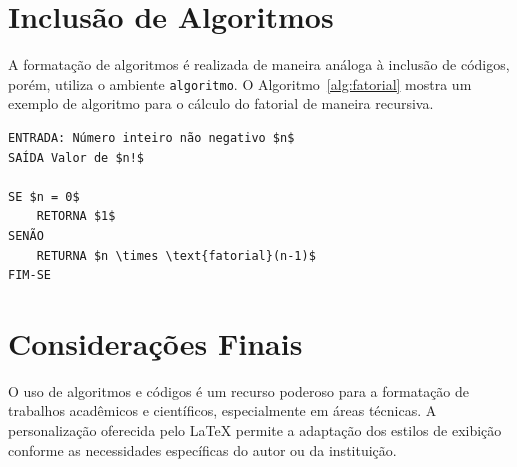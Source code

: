 \section{Inclusão de Algoritmos}

A formatação de algoritmos é realizada de maneira análoga à inclusão de códigos, porém, utiliza o ambiente \texttt{algoritmo}. O Algoritmo~\ref{alg:fatorial} mostra um exemplo de algoritmo para o cálculo do fatorial de maneira recursiva.

\begin{algoritmo}
\begin{lstlisting}[mathescape]
ENTRADA: Número inteiro não negativo $n$
SAÍDA Valor de $n!$

SE $n = 0$
    RETORNA $1$
SENÃO
    RETURNA $n \times \text{fatorial}(n-1)$
FIM-SE
\end{lstlisting}
\fonteautor
\end{algoritmo}

\section{Considerações Finais}

O uso de algoritmos e códigos é um recurso poderoso para a formatação de trabalhos acadêmicos e científicos, especialmente em áreas técnicas. A personalização oferecida pelo LaTeX permite a adaptação dos estilos de exibição conforme as necessidades específicas do autor ou da instituição.
